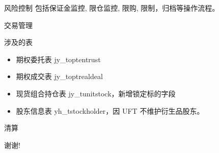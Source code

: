 \documentclass[12pt]{ctexbeamer}	%
\begin{document}
\begin{frame}{风险控制}
  包括保证金监控, 限仓监控, 限购, 限制，归档等操作流程。
\end{frame}

\begin{frame}{交易管理}
  \begin{block}{涉及的表}
    \begin{itemize}
      \item 期权委托表 jy\_toptentrust
      \item 期权成交表 jy\_toptrealdeal
      \item 现货组合持仓表 jy\_tunitstock，新增锁定标的字段
      \item 股东信息表 yh\_tstockholder，因 UFT 不维护衍生品股东。
    \end{itemize}
  \end{block}
\end{frame}

\begin{frame}{清算}
\end{frame}


\begin{frame}
\centerline{\Large 谢谢!}
\end{frame}
\end{document}
